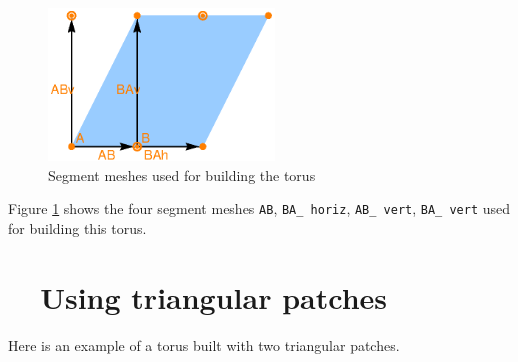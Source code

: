 \begin{figure}[ht] \centering
  \includegraphics[width=60mm]{torus-sketch.eps}
  \caption{Segment meshes used for building the torus}
  \label{\numb section 7.\numb fig 5}
\end{figure}

Figure \ref{\numb section 7.\numb fig 5} shows the four segment meshes {\small\tt AB},
{\small\tt BA\_\,horiz}, {\small\tt AB\_\,vert}, {\small\tt BA\_\,vert} used for
building this torus.



\section{~~Using triangular patches}\label{\numb section 7.\numb parag 9}

Here is an example of a torus built with two triangular patches.

